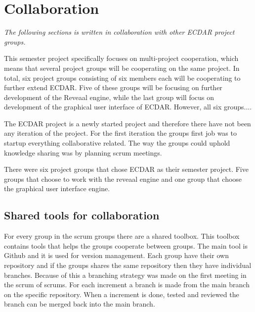 \section{Collaboration}\label{Scrum/agile-cooperation}
\textit{The following sections is written in collaboration with other ECDAR project groups.}



This semester project specifically focuses on multi-project cooperation, which means that several project groups will be cooperating on the same project. In total, six project groups consisting of six members each will be cooperating to further extend ECDAR. Five of these groups will be focusing on further development of the Reveaal engine, while the last group will focus on development of the graphical user interface of ECDAR. However, all six groups....


The ECDAR project is a newly started project and therefore there have not been any iteration of the project.
For the first iteration the groups first job was to startup everything collaborative related. 
The way the groups could uphold knowledge sharing was by planning scrum meetings.

There were six project groups that chose ECDAR as their semester project. 
Five groups that choose to work with the reveaal engine and one group that choose the graphical user interface engine.






\subsection{Shared tools for collaboration}
For every group in the scrum groups there are a shared toolbox.
This toolbox contains tools that helps the groups cooperate between groups.
The main tool is Github and it is used for version management.  
Each group have their own repository and if the groups shares the same repository then they have individual branches.
Because of this a branching strategy was made on the first meeting in the scrum of scrums.
For each increment a branch is made from the main branch on the specific repository. 
When a increment is done, tested and reviewed the branch can be merged back into the main branch.

